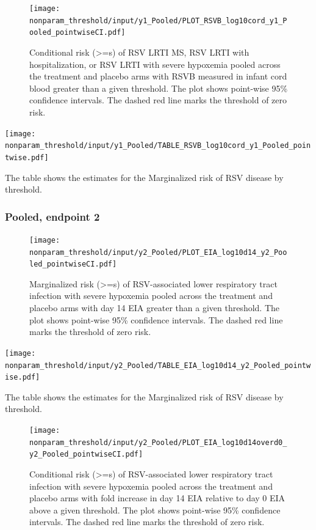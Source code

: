 \documentclass[11pt]{article}
\begin{document}
\begin{figure}[H]
\centering
\texttt{[image: nonparam\_threshold/input/y1\_Pooled/PLOT\_RSVB\_log10cord\_y1\_Pooled\_pointwiseCI.pdf]}
\caption{Conditional risk (>=s) of RSV LRTI MS, RSV LRTI with hospitalization, or RSV LRTI with severe hypoxemia pooled across the treatment and placebo arms with RSVB measured in infant cord blood greater than a given threshold. The plot shows point-wise 95\% confidence intervals. The dashed red line marks the threshold of zero risk.}
\end{figure}

\begin{table}[H]
\centering
\texttt{[image: nonparam\_threshold/input/y1\_Pooled/TABLE\_RSVB\_log10cord\_y1\_Pooled\_pointwise.pdf]}
\caption{The table shows the  estimates for the Marginalized risk of RSV disease by threshold. }
\end{table}

\hypertarget{pooled-endpoint-2}{%
\subsubsection{Pooled, endpoint 2}\label{pooled-endpoint-2}}

\begin{figure}[H]
\centering
\texttt{[image: nonparam\_threshold/input/y2\_Pooled/PLOT\_EIA\_log10d14\_y2\_Pooled\_pointwiseCI.pdf]}
\caption{Marginalized risk (>=s) of RSV-associated lower respiratory tract infection with severe hypoxemia pooled across the treatment and placebo arms with day 14 EIA greater than a given threshold. The plot shows point-wise 95\% confidence intervals. The dashed red line marks the threshold of zero risk.}
\end{figure}

\begin{table}[H]
\centering
\texttt{[image: nonparam\_threshold/input/y2\_Pooled/TABLE\_EIA\_log10d14\_y2\_Pooled\_pointwise.pdf]}
\caption{The table shows the  estimates for the Marginalized risk of RSV disease by threshold. }
\end{table}

\begin{figure}[H]
\centering
\texttt{[image: nonparam\_threshold/input/y2\_Pooled/PLOT\_EIA\_log10d14overd0\_y2\_Pooled\_pointwiseCI.pdf]}
\caption{Conditional risk (>=s) of RSV-associated lower respiratory tract infection with severe hypoxemia pooled across the treatment and placebo arms with fold increase in day 14 EIA relative to day 0 EIA above a given threshold. The plot shows point-wise 95\% confidence intervals. The dashed red line marks the threshold of zero risk.}
\end{figure}
\end{document}
